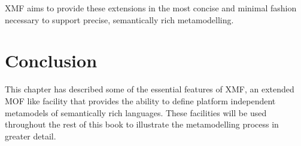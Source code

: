 XMF aims to provide these extensions in the most concise and
minimal fashion necessary to support precise, semantically rich
metamodelling.

\section{Conclusion}

This chapter has described some of the essential features of XMF,
an extended MOF like facility that provides the ability to define
platform independent metamodels of semantically rich languages.
These facilities will be used throughout the rest of this book to
illustrate the metamodelling process in greater detail.
